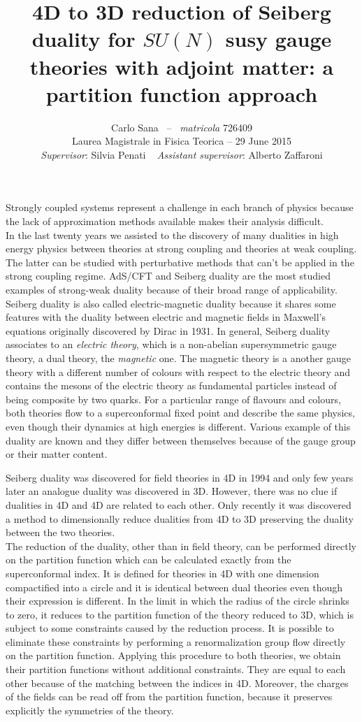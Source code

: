 \documentclass[a4paper,12pt]{article}
\author{
 Carlo Sana  ~--~ \emph{matricola} 726409 \\
 Laurea Magistrale in Fisica Teorica -- 29 June 2015\\
\emph{Supervisor}: Silvia Penati 
~
\emph{Assistant supervisor}: Alberto Zaffaroni\\
}
\date{}
\title{ \textbf{4D to 3D reduction of Seiberg duality for $SU(N)$ susy gauge theories with adjoint matter: a partition function approach }}
\begin{document}
\maketitle
Strongly coupled systems represent a challenge in each branch of physics because the lack of approximation methods available makes their analysis difficult.\\
In the last twenty years we assisted to the discovery of many dualities in high energy physics between theories at strong coupling and theories at weak coupling.
The latter can be studied with perturbative methods that can't be applied in the strong coupling regime.
AdS/CFT and Seiberg duality are the most studied examples of strong-weak duality because of their broad range of applicability.
Seiberg duality is also called electric-magnetic duality because it shares some features with the duality between electric and magnetic fields in Maxwell's equations originally discovered by Dirac in 1931.
In general, Seiberg duality associates to an \emph{electric theory}, which is a non-abelian supersymmetric gauge theory, a dual theory, the \emph{magnetic} one. 
The magnetic theory is a another gauge theory with a different number of colours with respect to the electric theory and contains the mesons of the electric theory as fundamental particles instead of being composite by two quarks.
For a particular range of flavours and colours, both theories flow to a superconformal fixed point and describe the same physics, even though their dynamics at high energies is different.
Various example of this duality are known and they differ between themselves because of the gauge group or their matter content.

Seiberg duality was discovered for field theories in 4D in 1994 and only few years later an analogue duality was discovered in 3D.
However, there was no clue if dualities in 4D and 4D are related to each other.
Only recently it was discovered a method to dimensionally reduce dualities from 4D to 3D preserving the duality between the two theories.\\
The reduction of the duality, other than in field theory, can be performed directly on the partition function which can be calculated exactly from the superconformal index. 
It is defined for theories in 4D with one dimension compactified into a circle and it is identical between dual theories even though their expression is different.
In the limit in which the radius of the circle shrinks to zero, it reduces to the partition function of the theory reduced to 3D, which is subject to some constraints caused by the reduction process.
It is possible to eliminate these constraints by performing a renormalization group flow directly on the partition function.
Applying this procedure to both theories, we obtain their partition functions without additional constraints. 
They are equal to each other because of the matching between the indices in 4D.
Moreover, the charges of the fields can be read off from the partition function, because it preserves explicitly the symmetries of the theory.
\end{document}
